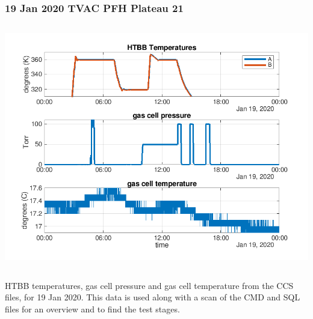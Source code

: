 \documentclass[10pt]{beamer}
\begin{document}
\begin{frame}
\frametitle{19 Jan 2020 TVAC PFH Plateau 21}
\begin{columns}[t]
\begin{column}{0.6\textwidth}
  \begin{centering}
  \includegraphics[width=\textwidth]{harvest_01-19/css_summary_19_jan.png}
  \end{centering}\vspace{3mm}


\end{column}
\end{columns}

HTBB temperatures, gas cell pressure and gas cell temperature from
the CCS files, for 19 Jan 2020.  This data is used along with a scan
of the CMD and SQL files for an overview and to find the test stages.

\end{frame}
\end{document}
